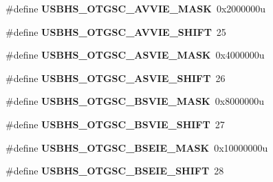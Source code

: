 \begin{DoxyCompactItemize}
\item 
\hypertarget{group___u_s_b_h_s___register___masks_ga3525d21089ce1dbc26ee44837ee97699}{}\#define {\bfseries U\+S\+B\+H\+S\+\_\+\+O\+T\+G\+S\+C\+\_\+\+A\+V\+V\+I\+E\+\_\+\+M\+A\+S\+K}~0x2000000u\label{group___u_s_b_h_s___register___masks_ga3525d21089ce1dbc26ee44837ee97699}

\item 
\hypertarget{group___u_s_b_h_s___register___masks_ga5cd2a05768b8355acff4394845678552}{}\#define {\bfseries U\+S\+B\+H\+S\+\_\+\+O\+T\+G\+S\+C\+\_\+\+A\+V\+V\+I\+E\+\_\+\+S\+H\+I\+F\+T}~25\label{group___u_s_b_h_s___register___masks_ga5cd2a05768b8355acff4394845678552}

\item 
\hypertarget{group___u_s_b_h_s___register___masks_ga1d06f172cffb9917c19c429e3c82121d}{}\#define {\bfseries U\+S\+B\+H\+S\+\_\+\+O\+T\+G\+S\+C\+\_\+\+A\+S\+V\+I\+E\+\_\+\+M\+A\+S\+K}~0x4000000u\label{group___u_s_b_h_s___register___masks_ga1d06f172cffb9917c19c429e3c82121d}

\item 
\hypertarget{group___u_s_b_h_s___register___masks_gab8f29e19af47a48c2f778e9d06c4b28d}{}\#define {\bfseries U\+S\+B\+H\+S\+\_\+\+O\+T\+G\+S\+C\+\_\+\+A\+S\+V\+I\+E\+\_\+\+S\+H\+I\+F\+T}~26\label{group___u_s_b_h_s___register___masks_gab8f29e19af47a48c2f778e9d06c4b28d}

\item 
\hypertarget{group___u_s_b_h_s___register___masks_ga65b9a5d4c0d0694626764bb8bff413b3}{}\#define {\bfseries U\+S\+B\+H\+S\+\_\+\+O\+T\+G\+S\+C\+\_\+\+B\+S\+V\+I\+E\+\_\+\+M\+A\+S\+K}~0x8000000u\label{group___u_s_b_h_s___register___masks_ga65b9a5d4c0d0694626764bb8bff413b3}

\item 
\hypertarget{group___u_s_b_h_s___register___masks_ga9e9ba4a098cf3ee0cfb0c6c4ab739c35}{}\#define {\bfseries U\+S\+B\+H\+S\+\_\+\+O\+T\+G\+S\+C\+\_\+\+B\+S\+V\+I\+E\+\_\+\+S\+H\+I\+F\+T}~27\label{group___u_s_b_h_s___register___masks_ga9e9ba4a098cf3ee0cfb0c6c4ab739c35}

\item 
\hypertarget{group___u_s_b_h_s___register___masks_ga3edfd2ba0f526a484e76c2bcce6df75c}{}\#define {\bfseries U\+S\+B\+H\+S\+\_\+\+O\+T\+G\+S\+C\+\_\+\+B\+S\+E\+I\+E\+\_\+\+M\+A\+S\+K}~0x10000000u\label{group___u_s_b_h_s___register___masks_ga3edfd2ba0f526a484e76c2bcce6df75c}

\item 
\hypertarget{group___u_s_b_h_s___register___masks_ga8added617b773bf2cc5dad10032047ed}{}\#define {\bfseries U\+S\+B\+H\+S\+\_\+\+O\+T\+G\+S\+C\+\_\+\+B\+S\+E\+I\+E\+\_\+\+S\+H\+I\+F\+T}~28\label{group___u_s_b_h_s___register___masks_ga8added617b773bf2cc5dad10032047ed}


\end{DoxyCompactItemize}
